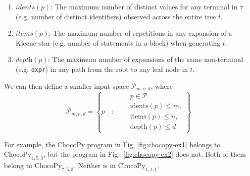 \documentclass[conference]{IEEEtran}
\newcommand{\code}{\texttt}
\begin{document}
\begin{enumerate}
    \item $\textit{idents}(p)$: The maximum number of distinct values for any terminal in $\tau$ (e.g. number of distinct identifiers) observed across the entire tree $t$.
    \item $\textit{items}(p)$: The maximum number of repetitions in any expansion of a Kleene-star (e.g. number of statements in a block) when generating $t$.
    \item $\textit{depth}(p)$: The maximum number of expansions of the same non-terminal (e.g. \code{expr}) in any path from the root to any leaf node in $t$.
\end{enumerate}
We can then define a smaller input space $\mathcal{P}_{m,n,d}$, where 
\begin{equation*}
    \mathcal{P}_{m,n,d} = \left\{p \quad :
    \begin{aligned}\quad & p \in \mathcal{P}\\ &\text{idents}(p) \le m,\\ &\text{items}(p) \le n,\\ &\text{depth}(p) \le d
    \end{aligned}
    \right\}
\end{equation*}

\noindent For example, the ChocoPy program in Fig. \ref{fig:chocopy-ex1} belongs to $\mathrm{ChocoPy}_{4,5,3}$, but the program in Fig.~\ref{fig:chocopy-ex2} does not. Both of them belong to $\mathrm{ChocoPy}_{7, 5, 3}$. Neither is in $\mathrm{ChocoPy}_{1, 1, 1}$.
\end{document}

